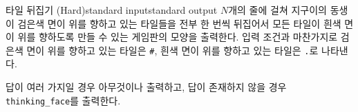 \begin{problem}{타일 뒤집기 (Hard)}{standard input}{standard output}
\OutputFile
$N$개의 줄에 걸쳐 지구이의 동생이 검은색 면이 위를 향하고 있는 타일들을 전부 한 번씩 뒤집어서 모든 타일이 흰색 면이 위를 향하도록 만들 수 있는 게임판의 모양을 출력한다. 입력 조건과 마찬가지로 검은색 면이 위를 향하고 있는 타일은 \texttt{\#}, 흰색 면이 위를 향하고 있는 타일은 \texttt{.}로 나타낸다.

답이 여러 가지일 경우 아무것이나 출력하고, 답이 존재하지 않을 경우 \texttt{thinking\_face}를 출력한다.

\Example

\begin{example}
%
%
\end{example}

\end{problem}
